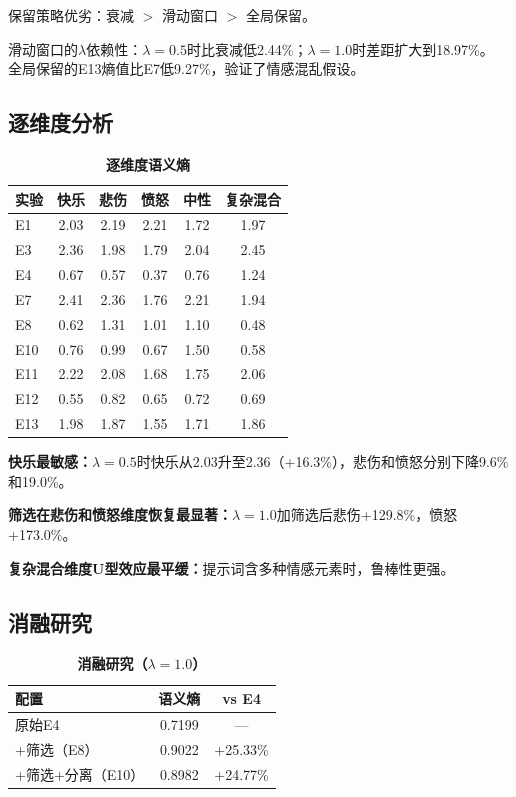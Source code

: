 \documentclass[a4paper, 11pt]{article}
\begin{document}
保留策略优劣：衰减 $>$ 滑动窗口 $>$ 全局保留。

滑动窗口的$\lambda$依赖性：$\lambda=0.5$时比衰减低2.44\%；$\lambda=1.0$时差距扩大到18.97\%。
全局保留的E13熵值比E7低9.27\%，验证了情感混乱假设。

\subsection{逐维度分析}

\begin{table}[ht]
  \centering\caption{\textbf{逐维度语义熵}}\label{tab:dim_full}\small
  \begin{tabular}{lccccc}\toprule
    实验 & 快乐 & 悲伤 & 愤怒 & 中性 & 复杂混合\\\midrule
    E1 & 2.03 & 2.19 & 2.21 & 1.72 & 1.97\\
    E3 & 2.36 & 1.98 & 1.79 & 2.04 & 2.45\\
    E4 & 0.67 & 0.57 & 0.37 & 0.76 & 1.24\\
    E7 & 2.41 & 2.36 & 1.76 & 2.21 & 1.94\\
    E8 & 0.62 & 1.31 & 1.01 & 1.10 & 0.48\\
    E10 & 0.76 & 0.99 & 0.67 & 1.50 & 0.58\\\midrule
    E11 & 2.22 & 2.08 & 1.68 & 1.75 & 2.06\\
    E12 & 0.55 & 0.82 & 0.65 & 0.72 & 0.69\\
    E13 & 1.98 & 1.87 & 1.55 & 1.71 & 1.86\\\bottomrule
  \end{tabular}
\end{table}

\textbf{快乐最敏感：}$\lambda=0.5$时快乐从2.03升至2.36（+16.3\%），悲伤和愤怒分别下降9.6\%和19.0\%。

\textbf{筛选在悲伤和愤怒维度恢复最显著：}$\lambda=1.0$加筛选后悲伤+129.8\%，愤怒+173.0\%。

\textbf{复杂混合维度U型效应最平缓：}提示词含多种情感元素时，鲁棒性更强。

\subsection{消融研究}

\begin{table}[ht]
  \centering\caption{\textbf{消融研究（$\lambda=1.0$）}}\label{tab:abl}\small
  \begin{tabular}{lcc}\toprule
    配置 & 语义熵 & vs E4\\\midrule
    原始E4 & 0.7199 & ---\\
    +筛选（E8） & 0.9022 & +25.33\%\\
    +筛选+分离（E10） & 0.8982 & +24.77\%\\\bottomrule
  \end{tabular}
\end{table}
\end{document}
